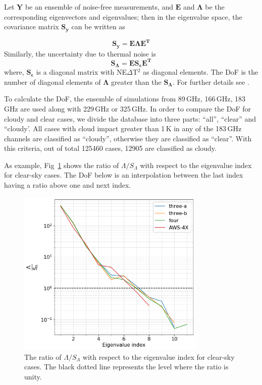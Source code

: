 \documentclass[12pt]{article}
\begin{document}
Let $\mathbf{Y}$ be an ensemble of noise-free measurements, and $\textbf{E}$
and $\mathbf{\Lambda}$ be the corresponding eigenvectors and eigenvalues; then
in the eigenvalue space, the covariance matrix $\mathbf{S_y}$ can be written as

\begin{equation}
\mathbf{S_y = E \Lambda E^T} 
\end{equation}
Similarly, the uncertainty due to thermal noise is
\begin{equation}
\mathbf{S_{\Lambda} = E S_{\epsilon} E^T }
\end{equation}
where, $\mathbf{S_{\epsilon}}$ is a diagonal matrix with NE$\Delta$T$^2$ as
diagonal elements. The DoF is the number of diagonal elements of
$\mathbf{\Lambda}$ greater than the $\mathbf{S_\Lambda}$. For further details
see \citet{eriksson:towar:20}.

To calculate the DoF, the ensemble of simulations from 89\,GHz, 166\,GHz,
183\,GHz are used along with 229\,GHz or 325\,GHz. In order to compare the DoF
for cloudy and clear cases, we divide the database into three parts: ``all'',
``clear'' and ``cloudy'. All cases with cloud impact greater than 1\,K in any
of the 183\,GHz channels are classified as ``cloudy'', otherwise they are
classified as ``clear''. With this criteria, out of total 125460 cases, 12905
are classified as cloudy.

As example, Fig~\ref{fig:DoF:clear:1200K} shows the ratio of
$\Lambda/S_\Lambda$ with respect to the eigenvalue index for clear-sky cases.
The DoF below is an interpolation between the last index having a ratio above
one and next index.

\begin{figure}[!tb]
	\centering
	\includegraphics[height=80mm]{DoF.png}
	\caption{ The ratio of $\Lambda/S_\Lambda$ with respect to the eigenvalue
      index for clear-sky cases. The black dotted line represents the level
      where the ratio is unity. }
	\label{fig:DoF:clear:1200K}
\end{figure}
\end{document}

